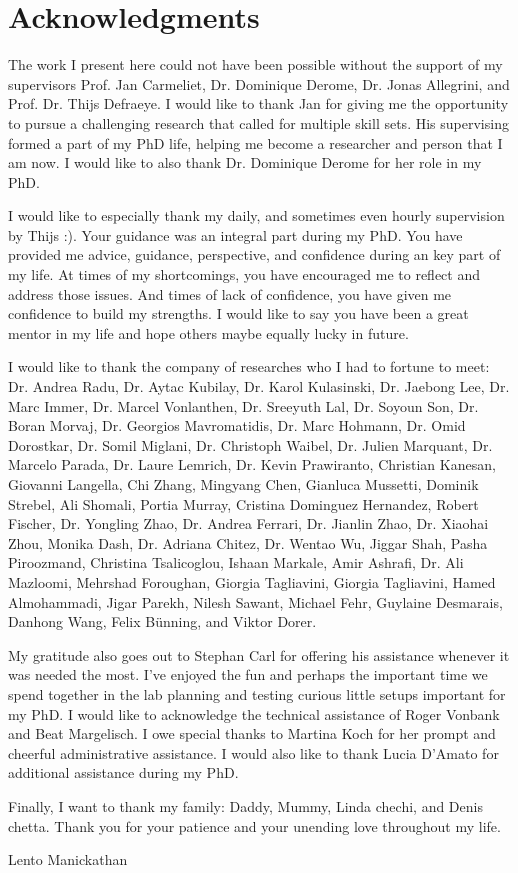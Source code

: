 
\chapter{Acknowledgments}

The work I present here could not have been possible without the support of my supervisors Prof. Jan Carmeliet, Dr. Dominique Derome, Dr. Jonas Allegrini, and Prof. Dr. Thijs Defraeye. I would like to thank Jan for giving me the opportunity to pursue a challenging research that called for multiple skill sets. His supervising formed a part of my PhD life, helping me become a researcher and person that I am now. I would like to also thank Dr. Dominique Derome for her role in my PhD. 

I would like to especially thank my daily, and sometimes even hourly supervision by Thijs :). Your guidance was an integral part during my PhD. You have provided me advice, guidance, perspective, and confidence during an key part of my life. At times of my shortcomings, you have encouraged me to reflect and address those issues. And times of lack of confidence, you have given me confidence to build my strengths. I would like to say you have been a great mentor in my life and hope others maybe equally lucky in future. 

I would like to thank the company of researches who I had to fortune to meet: Dr. Andrea Radu, Dr. Aytac Kubilay, Dr. Karol Kulasinski, Dr. Jaebong Lee, Dr. Marc Immer, Dr. Marcel Vonlanthen, Dr. Sreeyuth Lal, Dr. Soyoun Son, Dr. Boran Morvaj, Dr. Georgios Mavromatidis, Dr. Marc Hohmann, Dr. Omid Dorostkar, Dr. Somil Miglani, Dr. Christoph Waibel, Dr. Julien Marquant, Dr. Marcelo Parada, Dr. Laure Lemrich, Dr. Kevin Prawiranto, Christian Kanesan, Giovanni Langella, Chi Zhang, Mingyang Chen, Gianluca Mussetti, Dominik Strebel, Ali Shomali, Portia Murray, Cristina Dominguez Hernandez, Robert Fischer, Dr. Yongling Zhao, Dr. Andrea Ferrari, Dr. Jianlin Zhao, Dr. Xiaohai Zhou, Monika Dash, Dr. Adriana Chitez, Dr. Wentao Wu, Jiggar Shah, Pasha Piroozmand, Christina Tsalicoglou, Ishaan Markale, Amir Ashrafi, Dr. Ali Mazloomi, Mehrshad Foroughan, Giorgia Tagliavini, Giorgia Tagliavini, Hamed Almohammadi, Jigar Parekh, Nilesh Sawant, Michael Fehr, Guylaine Desmarais, Danhong Wang, Felix B\"unning, and Viktor Dorer. 

My gratitude also goes out to Stephan Carl for offering his assistance whenever it was needed the most. I've enjoyed the fun and perhaps the important time we spend together in the lab planning and testing curious little setups important for my PhD. I would like to acknowledge the technical assistance of Roger Vonbank and Beat Margelisch. I owe special thanks to Martina Koch for her prompt and cheerful administrative assistance. I would also like to thank Lucia D'Amato for additional assistance during my PhD.

Finally, I want to thank my family: Daddy, Mummy, Linda chechi, and Denis chetta. Thank you for your patience and your unending love throughout my life.

\begin{flushright}
Lento Manickathan\\
\myMonthYear
\end{flushright}
